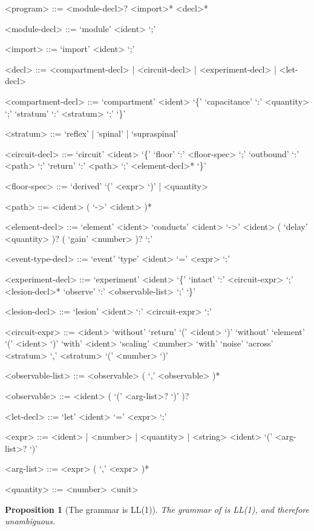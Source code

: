 \documentclass[11pt,twocolumn,a4paper]{article}
\theoremstyle{thmstyle}
\newtheorem{proposition}[theorem]{Proposition}
\theoremstyle{definition}
\theoremstyle{remark}
\begin{document}
\begin{grammar}
<program> ::= <module-decl>? <import>* <decl>*

<module-decl> ::= `module' <ident> `;'

<import> ::= `import' <ident> `;'

<decl> ::= <compartment-decl> | <circuit-decl>
         | <experiment-decl> | <let-decl>

<compartment-decl> ::= `compartment' <ident> `\{'
  `capacitance' `:' <quantity> `;'
  `stratum' `:' <stratum> `;' `\}'

<stratum> ::= `reflex' | `spinal' | `supraspinal'

<circuit-decl> ::= `circuit' <ident> `\{'
  `floor' `:' <floor-spec> `;'
  `outbound' `:' <path> `;'
  `return' `:' <path> `;'
  <element-decl>* `\}'

<floor-spec> ::= `derived' `(' <expr> `)' | <quantity>

<path> ::= <ident> ( `->' <ident> )*

<element-decl> ::= `element' <ident> `conducts' <ident> `->' <ident>
  ( `delay' <quantity> )? ( `gain' <number> )? `;'

<event-type-decl> ::= `event' `type' <ident> `=' <expr> `;'

<experiment-decl> ::= `experiment' <ident> `\{'
  `intact' `:' <circuit-expr> `;'
  <lesion-decl>*
  `observe' `:' <observable-list> `;' `\}'

<lesion-decl> ::= `lesion' <ident> `:' <circuit-expr> `;'

<circuit-expr> ::= <ident>
   `without' `return' `(' <ident> `)'
   `without' `element' `(' <ident> `)'
   `with' <ident> `scaling' <number>
   `with' `noise' `across' <stratum> `,' <stratum>
       `(' <number> `)'

<observable-list> ::= <observable> ( `,' <observable> )*

<observable> ::= <ident> ( `(' <arg-list>? `)' )?

<let-decl> ::= `let' <ident> `=' <expr> `;'

<expr> ::= <ident> | <number> | <quantity> | <string>
  \alt <ident> `(' <arg-list>? `)'

<arg-list> ::= <expr> ( `,' <expr> )*

<quantity> ::= <number> <unit>
\end{grammar}

\begin{proposition}[The grammar is LL(1)]
\label{prop:ll1}
The grammar of  is LL(1), and therefore unambiguous.
\end{proposition}
\end{document}
